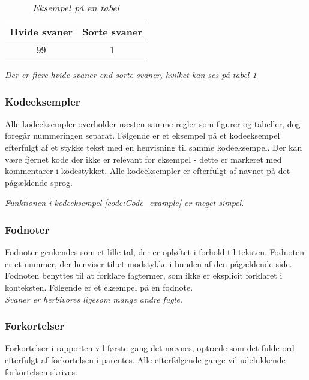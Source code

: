 \begin{table}[ht]
    \centering
    \begin{tabular}{ c c }
        \textbf{Hvide svaner} & \textbf{Sorte svaner} \\
        \midrule
        99 & 1 \\
    \end{tabular}
    \caption{\textit{Eksempel på en tabel}}
    \label{tab:abc}
\end{table}

\noindent \textit{Der er flere hvide svaner end sorte svaner, hvilket kan ses på tabel \ref{tab:abc}}

\subsubsection*{Kodeeksempler}
Alle kodeeksempler overholder næsten samme regler som figurer og tabeller, dog foregår nummeringen separat. Følgende er et eksempel på et kodeeksempel efterfulgt af et stykke tekst med en henvisning til samme kodeeksempel. Der kan være fjernet kode der ikke er relevant for eksempel - dette er markeret med kommentarer i kodestykket. Alle kodeeksempler er efterfulgt af navnet på det pågældende sprog.


\noindent \textit{Funktionen i kodeeksempel \ref{code:Code_example} er meget simpel.}

\subsubsection*{Fodnoter}
Fodnoter genkendes som et lille tal, der er opløftet i forhold til teksten. Fodnoten er et nummer, der henviser til et modstykke i bunden af den pågældende side. Fodnoten benyttes til at forklare fagtermer, som ikke er eksplicit forklaret i konteksten. Følgende er et eksempel på en fodnote.\\

\noindent \textit{Svaner er herbivores ligesom mange andre fugle.}

\subsubsection*{Forkortelser}
Forkortelser i rapporten vil første gang det nævnes, optræde som det fulde ord efterfulgt af forkortelsen i parentes. Alle efterfølgende gange vil udelukkende forkortelsen skrives. \\

